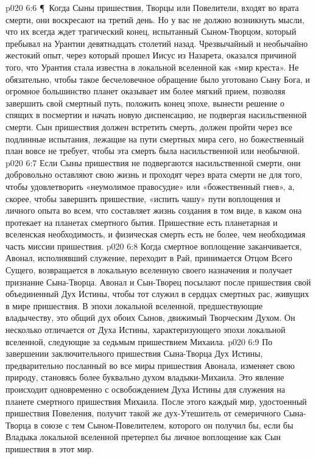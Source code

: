 \vs p020 6:6 \P\ Когда Сыны пришествия, Творцы или Повелители, входят во врата смерти, они воскресают на третий день. Но у вас не должно возникнуть мысли, что их всегда ждет трагический конец, испытанный Сыном\hyp{}Творцом, который пребывал на Урантии девятнадцать столетий назад. Чрезвычайный и необычайно жестокий опыт, через который прошел Иисус из Назарета, оказался причиной того, что Урантия стала известна в локальной вселенной как «мир креста». Не обязательно, чтобы такое бесчеловечное обращение было уготовано Сыну Бога, и огромное большинство планет оказывает им более мягкий прием, позволяя завершить свой смертный путь, положить конец эпохе, вынести решение о спящих в посмертии и начать новую диспенсацию, не подвергая насильственной смерти. Сын пришествия должен встретить смерть, должен пройти через все подлинные испытания, лежащие на пути смертных мира сего, но божественный план вовсе не требует, чтобы эта смерть была насильственной или необычной.
\vs p020 6:7 Если Сыны пришествия не подвергаются насильственной смерти, они добровольно оставляют свою жизнь и проходят через врата смерти не для того, чтобы удовлетворить «неумолимое правосудие» или «божественный гнев», а, скорее, чтобы завершить пришествие, «испить чашу» пути воплощения и личного опыта во всем, что составляет жизнь создания в том виде, в каком она протекает на планетах смертного бытия. Пришествие есть планетарная и вселенская необходимость, и физическая смерть есть не более, чем необходимая часть миссии пришествия.
\vs p020 6:8 Когда смертное воплощение заканчивается, Авонал, исполнявший служение, переходит в Рай, принимается Отцом Всего Сущего, возвращается в локальную вселенную своего назначения и получает признание Сына\hyp{}Творца. Авонал и Сын\hyp{}Творец посылают после пришествия свой объединенный Дух Истины, чтобы тот служил в сердцах смертных рас, живущих в мире пришествия. В эпохи локальной вселенной, предшествующие владычеству, это общий дух обоих Сынов, движимый Творческим Духом. Он несколько отличается от Духа Истины, характеризующего эпохи локальной вселенной, следующие за седьмым пришествием Михаила.
\vs p020 6:9 По завершении заключительного пришествия Сына\hyp{}Творца Дух Истины, предварительно посланный во все миры пришествия Авонала, изменяет свою природу, становясь более буквально духом владыки\hyp{}Михаила. Это явление происходит одновременно с освобождением Духа Истины для служения на планете смертного пришествия Михаила. После этого каждый мир, удостоенный пришествия Повеления, получит такой же дух\hyp{}Утешитель от семеричного Сына\hyp{}Творца в союзе с тем Сыном\hyp{}Повелителем, которого он получил бы, если бы Владыка локальной вселенной претерпел бы личное воплощение как Сын пришествия в этот мир.
